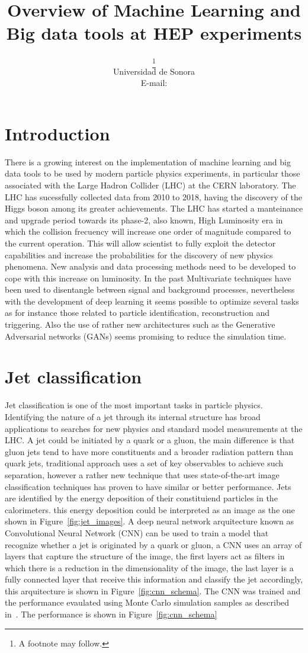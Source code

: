\documentclass{PoS}
\title{Overview of Machine Learning and Big data tools at HEP experiments}
\author{\speaker{A. Castaneda}\thanks{A footnote may follow.}\\
        Universidad de Sonora\\
        E-mail: \email{castaned@cern.ch}}
\begin{document}
\section{Introduction}


There is a growing interest on the implementation of machine learning and big data tools to be used by modern particle physics
experiments, in particular those associated with the Large Hadron Collider (LHC) at the CERN laboratory. The LHC has sucessfully
collected data from 2010 to 2018, having the discovery of the Higgs boson among its greater achievements. The LHC has started
a manteinance and upgrade period towards its phase-2, also known, High Luminosity era in which the collision frecuency will increase one
order of magnitude compared to the current operation. This will allow scientist to fully exploit the detector capabilities and increase
the probabilities for the discovery of new physics phenomena.  New analysis and data processing methods need to be developed to cope with
this increase on luminosity. In the past Multivariate techniques have been used to disentangle between signal and background processes,
nevertheless with the development of deep learning it seems possible to optimize several tasks as for instance those related to particle identification, reconstruction and triggering.
Also the use of rather new architectures such as the Generative Adversarial networks (GANs) seems promising to reduce the simulation time.


\section{Jet classification}

Jet classification is one of the most important tasks in particle physics. Identifying the nature of a jet through its internal structure
has broad applications to searches for new physics and standard model measurements at the LHC.  A jet could be initiated by a quark or a gluon,
the main difference is that gluon jets tend to have more constituents and a broader radiation pattern than quark jets, traditional approach uses
a set of key observables to achieve such separation, however a rather new technique that uses state-of-the-art image classification techniques has
proven to have similar or better performance. Jets are identified by the energy deposition of their constituiend particles in the calorimeters.
this energy deposition could be interpreted as an 
image as the one shown in Figure~\ref{fig:jet_images}.  A deep neural network arquitecture known as Convolutional Neural Network (CNN) can be used
to train a model that recognize whether a jet is originated by a quark or gluon, a CNN uses an array of layers that capture the structure of the image,
the first layers act as filters in which there is a reduction in the dimensionality of the image, the last layer is a fully connected layer that receive this
information and classify the jet accordingly, this arquitecture is shown in Figure~\ref{fig:cnn_schema}. The CNN was trained and the performance evaulated
using Monte Carlo simulation samples as described in~\cite{jet_cnn}.  The performance is shown in Figure~\ref{fig:cnn_schema}
\end{document}
